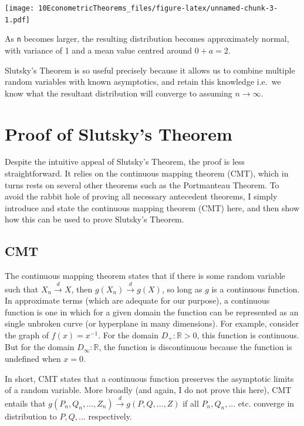 \documentclass[
]{book}
\begin{document}
\texttt{[image: 10EconometricTheorems\_files/figure-latex/unnamed-chunk-3-1.pdf]}

As \texttt{n} becomes larger, the resulting distribution becomes approximately normal, with variance of 1 and a mean value centred around \(0 + a = 2\).

Slutsky's Theorem is so useful precisely because it allows us to combine multiple random variables with known asymptotics, and retain this knowledge i.e.~we know what the resultant distribution will converge to assuming \(n \to \infty\).

\hypertarget{proof-of-slutskys-theorem}{%
\section{Proof of Slutsky's Theorem}\label{proof-of-slutskys-theorem}}

Despite the intuitive appeal of Slutsky's Theorem, the proof is less straightforward. It relies on the continuous mapping theorem (CMT), which in turns rests on several other theorems such as the Portmanteau Theorem. To avoid the rabbit hole of proving all necessary antecedent theorems, I simply introduce and state the continuous mapping theorem (CMT) here, and then show how this can be used to prove Slutsky's Theorem.

\hypertarget{cmt}{%
\subsection{CMT}\label{cmt}}

The continuous mapping theorem states that if there is some random variable such that \(X_n \xrightarrow{d} X\), then \(g(X_n) \xrightarrow{d} g(X)\), so long as \(g\) is a continuous function. In approximate terms (which are adequate for our purpose), a continuous function is one in which for a given domain the function can be represented as an single unbroken curve (or hyperplane in many dimensions). For example, consider the graph of \(f(x) = x^{-1}\). For the domain \(D_{+}: \mathbb{R} > 0\), this function is continuous. But for the domain \(D_{\infty}: \mathbb{R}\), the function is discontinuous because the function is undefined when \(x = 0\).

In short, CMT states that a continuous function preserves the asymptotic limits of a random variable. More broadly (and again, I do not prove this here), CMT entails that \(g(P_n,Q_n,...,Z_n) \xrightarrow{d} g(P,Q,...,Z)\) if all \(P_n, Q_n,...\) etc. converge in distribution to \(P,Q,...\) respectively.
\end{document}
